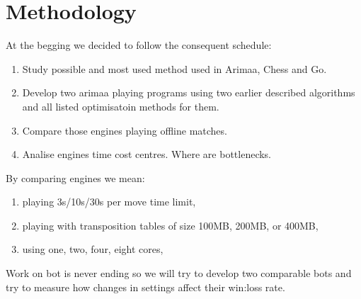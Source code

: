 \chapter{Methodology}

At the begging we decided to follow the consequent schedule:

\begin{enumerate}%
\item Study possible and most used method used in Arimaa, Chess and Go.
\item Develop two arimaa playing programs using two earlier described
	  algorithms and all listed optimisatoin methods for them.
\item Compare those engines playing offline matches.
\item Analise engines time cost centres. Where are bottlenecks.
\end{enumerate}

\noindent By comparing engines we mean:

\begin{enumerate}
\item playing 3s/10s/30s per move time limit,
\item playing with transposition tables of size 100MB, 200MB, or 400MB,
\item using one, two, four, eight cores,
\end{enumerate}

Work on bot is never ending so we will try to develop two comparable bots and
try to measure how changes in settings affect their win:loss rate.
